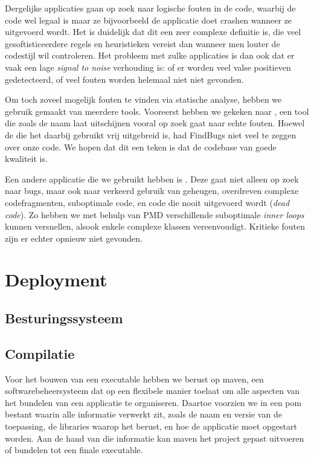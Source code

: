 Dergelijke applicaties gaan op zoek naar logische fouten in de code, waarbij de code wel legaal is maar ze bijvoorbeeld de applicatie doet crashen wanneer ze uitgevoerd wordt. Het is duidelijk dat dit een zeer complexe definitie is, die veel gesoftisticeerdere regels en heuristieken vereist dan wanneer men louter de codestijl wil controleren. Het probleem met zulke applicaties is dan ook dat er vaak een lage \emph{signal to noise} verhouding is: of er worden veel valse positieven gedetecteerd, of veel fouten worden helemaal niet niet gevonden.

Om toch zoveel mogelijk fouten te vinden via statische analyse, hebben we gebruik gemaakt van meerdere tools. Vooreerst hebben we gekeken naar , een tool die zoals de naam laat uitschijnen vooral op zoek gaat naar echte fouten. Hoewel de  die het daarbij gebruikt vrij uitgebreid is, had FindBugs niet veel te zeggen over onze code. We hopen dat dit een teken is dat de codebase van goede kwaliteit is.

Een andere applicatie die we gebruikt hebben is . Deze gaat niet alleen op zoek naar bugs, maar ook naar verkeerd gebruik van geheugen, overdreven complexe codefragmenten, suboptimale code, en code die nooit uitgevoerd wordt (\emph{dead code}). Zo hebben we met behulp van PMD verschillende suboptimale \emph{inner loops} kunnen versnellen, alsook enkele complexe klassen vereenvoudigt. Kritieke fouten zijn er echter opnieuw niet gevonden.

\chapter{Deployment}

\section{Besturingssysteem}


\section{Compilatie}

Voor het bouwen van een executable hebben we berust op \ac{maven}, een softwarebeheersysteem dat op een flexibele manier toelaat om alle aspecten van het bundelen van een applicatie te organiseren. Daartoe voorzien we in een \ac{pom} bestant waarin alle informatie verwerkt zit, zoals de naam en versie van de toepassing, de libraries waarop het berust, en hoe de applicatie moet opgestart worden. Aan de hand van die informatie kan \ac{maven} het project gepast uitvoeren of bundelen tot een finale executable.

